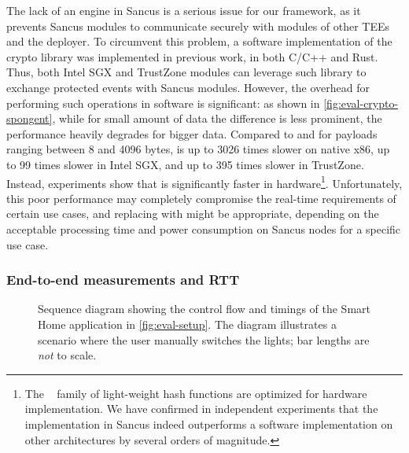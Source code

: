 The lack of an \aes{} engine in Sancus is a serious issue for our framework, as
it prevents Sancus modules to communicate securely with modules of other
\acp{TEE} and the deployer. To circumvent this problem, a software
implementation of the \spongent{} crypto library was implemented in previous
work, in both C/C++ and Rust. Thus, both Intel \ac{SGX} and TrustZone modules
can leverage such library to exchange protected events with Sancus modules.
However, the overhead for performing such operations in software is significant:
as shown in \cref{fig:eval-crypto-spongent}, while for small amount of data the
difference is less prominent, the performance heavily degrades for bigger data.
Compared to \aes{} and for payloads ranging between 8 and 4096 bytes,
\spongent{} is up to 3026 times slower on native x86, up to 99 times slower in
Intel \ac{SGX}, and up to 395 times slower in TrustZone. Instead, experiments
show that \spongent{} is significantly faster in hardware\footnote{The
\spongent{}~\cite{spongent} family of light-weight hash functions are optimized
for hardware implementation. We have confirmed in independent experiments that
the implementation in Sancus indeed outperforms a software implementation on
other architectures by several orders of magnitude.}. Unfortunately, this poor
performance may completely compromise the real-time requirements of certain use
cases, and replacing \spongent{} with \aes{} might be appropriate, depending on
the acceptable processing time and power consumption on Sancus nodes for a
specific use case.

\subsubsection{End-to-end measurements and RTT}
\label{eval:microb-rtt}

\newcommand{\seqboxtext}{}
\begin{figure}
  \resizebox{0.92\linewidth}{!}{} \caption[Control flow and timings of the smart home application]{Sequence
  diagram showing the control flow and timings of the Smart Home application in
  \cref{fig:eval-setup}. The diagram illustrates a scenario where the user
  manually switches the lights; bar lengths are \emph{not} to scale.}
  \label{flt:sequence}
\end{figure}



